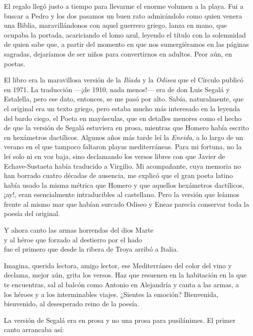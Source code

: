 El regalo llegó justo a tiempo para llevarme el enorme volumen a la playa. Fui a buscar a Pedro y los dos pasamos un buen rato admirándolo como quien venera una Biblia, maravillándonos con aquel guerrero griego, lanza en mano, que ocupaba la portada, acariciando el lomo azul, leyendo el título con la solemnidad de quien sabe que, a partir del momento en que nos sumergiéramos en las páginas sagradas, dejaríamos de ser niños para convertirnos en adultos. Peor aún, en poetas.

El libro era la maravillosa versión de la \emph{Ilíada} y la \emph{Odisea} que el Círculo publicó en 1971. La traducción ---¡de 1910, nada menos!--- era de don Luis Segalá y Estalella, pero ese dato, entonces, se me pasó por alto. Sabía, naturalmente, que el original era un texto griego, pero estaba mucho más interesado en la leyenda del bardo ciego, el Poeta en mayúsculas, que en detalles menores como el hecho de que la versión de Segalá estuviera en prosa, mientras que Homero había escrito en hexámetros dactílicos. Algunos años más tarde leí la \emph{Eneida}, a lo largo de un verano en el que tampoco faltaron playas mediterráneas. Para mi fortuna, no la leí solo ni en voz baja, sino declamando los versos libres con que Javier de Echave-Sustaeta había traducido a Virgilio. Mi acompañante, cuya memoria no han borrado cuatro décadas de ausencia, me explicó que el gran poeta latino había usado la misma métrica que Homero y que aquellos hexámetros dactílicos, ¡ay!, eran esencialmente intraducibles al castellano. Pero la versión que leíamos frente al mismo mar que habían surcado Odiseo y Eneas parecía conservar toda la poesía del original.

\begin{versocita}
Y ahora canto las armas horrendas del dios Marte\\
y al héroe que forzado al destierro por el hado\\
fue el primero que desde la ribera de Troya arribó a Italia.
\end{versocita}

Imagina, querida lectora, amigo lector, ese Mediterráneo del color del vino y declama, mejor aún, grita los versos. Haz que resuenen en la habitación en la que te encuentras, sal al balcón como Antonio en Alejandría y canta a las armas, a los héroes y a los interminables viajes. ¿Sientes la emoción? Bienvenida, bienvenido, al desesperado reino de la poesía.

La versión de Segalá era en prosa y no una prosa para pusilánimes. El primer canto arrancaba así:

